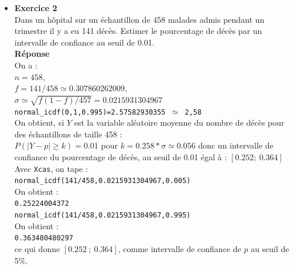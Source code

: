 \documentclass[a4paper,11pt]{book}
\begin{document}
\begin{itemize}
\item {\bf Exercice 2}\\
Dans un h\^opital sur un \'echantillon de 458 malades admis pendant un trimestre il y a eu 141 d\'ec\`es. Estimer le pourcentage de d\'ec\`es par un intervalle de confiance au seuil de 0.01.\\
{\bf R\'eponse}\\
On a :\\
$n=458$,\\
 $f=141/458 \simeq 0.307860262009$,\\
 $\sigma \simeq \sqrt{f(1-f)/457}=0.0215931304967$\\
{\tt normal\_icdf(0,1,0.995)=2.57582930355 $\simeq$ 2,58}\\
On obtient, si $Y$ est la variable al\'eatoire moyenne du nombre de d\'ec\`es 
pour des \'echantillons de taille 458 :\\
$P(|Y-p|\geq k)=0.01$ pour $k=0.258*\sigma \simeq 0.056$
donc un intervalle de confiance du pourcentage de d\'ec\`es, au seuil de 0.01 
\'egal \`a :
$[0.252; \ 0.364]$\\
Avec {\tt Xcas}, on tape :\\
{\tt normal\_icdf(141/458,0.0215931304967,0.005)} \\
On obtient :\\
{\tt 0.25224004372}\\
{\tt normal\_icdf(141/458,0.0215931304967,0.995)} \\
On obtient :\\
{\tt 0.363480480297}\\
ce qui donne $[0.252\ ;\  0.364]$, comme intervalle de
confiance de $p$ au seuil de 5\%.
\end{itemize}
\end{document}
